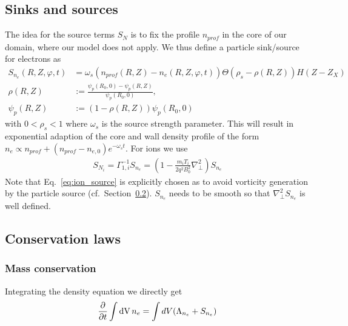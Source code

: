 \subsection{Sinks and sources} \label{sec:sources}
The idea for the source terms $S_N$ is to fix the profile $n_{prof}$ in the
core of our domain, where our model does not apply.
We thus define a particle sink/source for electrons as
\begin{align} \label{eq:electron_source}
  S_{n_e}(R,Z,\varphi, t) &= \omega_s
    (n_{prof}(R,Z) - n_e(R,Z,\varphi, t))\Theta( \rho_{s} -\rho(R,Z)) H(Z-Z_X)\\
    \rho(R,Z) &:= \frac{\psi_p(R_0,0)- \psi_p(R,Z) }{\psi_p(R_0,0)},\\
    \psi_p(R,Z)&:= (1-\rho(R,Z))\psi_p(R_0,0)
\end{align}
with $0 < \rho_{s}<1$
where $\omega_s$ is the source strength parameter.
This will result in exponential adaption of the core and wall
density profile of the form $n_e \propto n_{prof}+(n_{prof}-n_{e,0})e^{-\omega_st}$.
For ions we use
\begin{align}
    S_{N_i} = \Gamma_{1,i}^{-1} S_{n_e} = \left(1-\frac{m_i T_i}{2q^2 B_0^2} \nabla_\perp^2\right) S_{n_e}
  \label{eq:ion_source}
\end{align}
Note that Eq.~\eqref{eq:ion_source} is explicitly chosen as to avoid vorticity generation
by the particle source (cf.~Section~\ref{sec:conservation}). $S_{n_e}$ needs to be smooth
so that $\nabla_\perp^2 S_{n_e}$ is well defined.


\subsection{Conservation laws} \label{sec:conservation}
\subsubsection{Mass conservation}
Integrating the density equation we directly get
\begin{align} \label{eq:mass_conservation}
  \frac{\partial}{\partial t} \int \mathrm{dV}\, n_e =  \int dV (\Lambda_{n_e}+S_{n_e})
\end{align}
